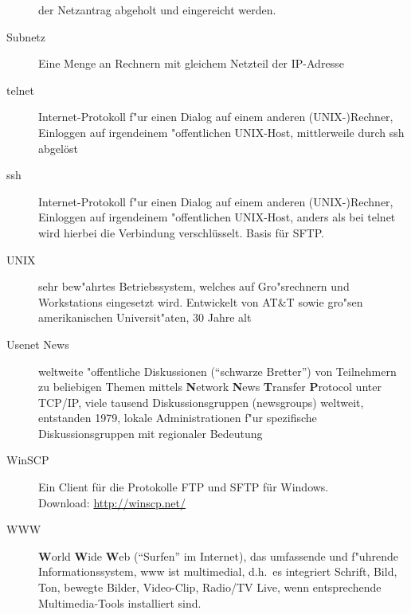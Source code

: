 \begin{description}
    der Netzantrag abgeholt und eingereicht werden.  
  \item[Subnetz] Eine Menge an Rechnern mit gleichem Netzteil der IP-Adresse
  \item[telnet] Internet-Protokoll f"ur einen Dialog auf einem anderen
    (UNIX-)Rechner, Einloggen auf irgendeinem "offentlichen UNIX-Host,
    mittlerweile durch ssh abgelöst
  \item[ssh] Internet-Protokoll f"ur einen Dialog auf einem anderen
    (UNIX-)Rechner, Einloggen auf irgendeinem "offentlichen UNIX-Host,
    anders als bei telnet  wird hierbei die Verbindung
    verschlüsselt. Basis für SFTP.
  \item[UNIX] sehr bew"ahrtes Betriebssystem, welches auf Gro"srechnern und
    Workstations eingesetzt wird. Entwickelt von AT\&T sowie gro"sen
    amerikanischen Universit"aten, 30 Jahre alt
  \item[Usenet News] weltweite "offentliche Diskussionen ("`schwarze Bretter"')
    von Teilnehmern zu beliebigen Themen mittels \textbf{N}etwork
    \textbf{N}ews \textbf{T}ransfer \textbf{P}rotocol unter TCP/IP, viele
    tausend Diskussionsgruppen (newsgroups) weltweit, entstanden 1979, lokale
    Administrationen f"ur spezifische Diskussionsgruppen mit regionaler
    Bedeutung
  \item[WinSCP] Ein Client für die Protokolle \glossar FTP und
    \glossar SFTP für Windows.\\
    Download: \url{http://winscp.net/}
  \item[WWW] \textbf{W}orld \textbf{W}ide \textbf{W}eb ("`Surfen"' im
    Internet), das umfassende und f"uhrende Informationssystem, www ist
    multimedial, d.h.\  es integriert Schrift, Bild, Ton, bewegte Bilder,
    Video-Clip, Radio/TV Live, wenn entsprechende Multimedia-Tools installiert
    sind.
\end{description}

